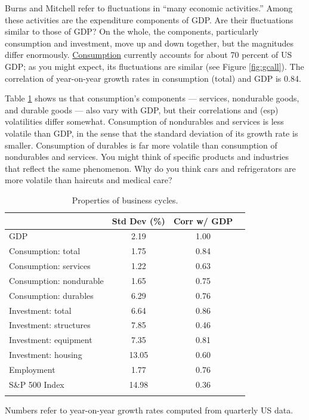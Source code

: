Burns and Mitchell refer to fluctuations in
``many economic activities.''
Among these activities are the expenditure
components of GDP.
Are their fluctuations similar to those of GDP?
On the whole, the components, particularly consumption and investment,
move up and down together, but the magnitudes differ enormously.
\href{http://research.stlouisfed.org/fred2/series/PCECC96?cid=110}{Consumption}
currently accounts for about 70 percent of US GDP;
as you might expect, its fluctuations are similar (see Figure \ref{fig:gcall}).
The correlation of year-on-year growth rates in consumption (total)
and GDP is 0.84.

Table \ref{tab:cycleprops} shows us that consumption's components ---
services, nondurable goods, and durable goods --- also vary with GDP,
but their correlations and (esp) volatilities differ somewhat.
Consumption of nondurables and services
is less volatile than GDP, in the sense that
the standard deviation of its growth rate is smaller.
Consumption of durables is far more
volatile %
than consumption of nondurables and services.
You might think of specific products and industries that reflect
the same phenomenon.
Why do you think cars and refrigerators
are more volatile than haircuts and medical care?

\begin{table}[h!]
\centering
\caption{Properties of business cycles.}
\label{tab:cycleprops}
\begin{tabular*}{0.8\textwidth}{l@{\extracolsep{\fill}}ccc}
\toprule
        &  Std Dev (\%)  &  Corr w/ GDP  \\
\midrule
GDP     &      2.19          &    1.00      \\
Consumption:  total      &  1.75  &  0.84   \\
Consumption:  services   &  1.22  &  0.63   \\
Consumption:  nondurable &  1.65  &  0.75   \\
Consumption:  durables   &  6.29  &  0.76   \\
Investment:  total       &  6.64  &  0.86   \\
Investment:  structures  &  7.85  &  0.46   \\
Investment:  equipment   &  7.35  &  0.81   \\
Investment:  housing     &  13.05\phantom{1} &  0.60   \\
Employment               &  1.77  &  0.76   \\
S\&P 500 Index           &  14.98\phantom{1}  &  0.36   \\
\bottomrule
\addlinespace
\end{tabular*}
\begin{minipage}{0.8\textwidth}
\footnotesize{Numbers refer to year-on-year growth rates computed from quarterly US data.}
\end{minipage}
\end{table}

